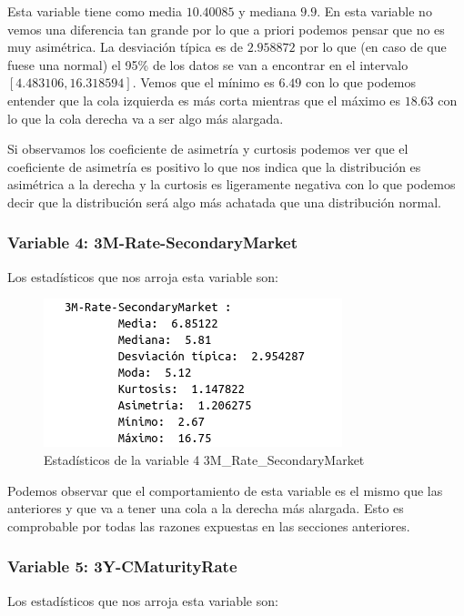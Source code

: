 \documentclass[12pt,a4paper]{article}
\begin{document}
Esta variable tiene como media $10.40085$ y mediana $9.9$. En esta variable no vemos una diferencia tan grande por lo que a priori podemos pensar que no es muy asimétrica. La desviación típica es de $2.958872$ por lo que (en caso de que fuese una normal) el 95\% de los datos se van a encontrar en el intervalo $[4.483106, 16.318594]$. Vemos que el mínimo es $6.49$ con lo que podemos entender que la cola izquierda es más corta mientras que el máximo es $18.63$ con lo que la cola derecha va a ser algo más alargada.

Si observamos los coeficiente de asimetría y curtosis podemos ver que el coeficiente de asimetría es positivo lo que nos indica que la distribución es asimétrica a la derecha y la curtosis es ligeramente negativa con lo que podemos decir que la distribución será algo más achatada que una distribución normal.

\subsubsection*{Variable 4: 3M-Rate-SecondaryMarket}

Los estadísticos que nos arroja esta variable son:

\begin{figure}[H]
	\centering
	\includegraphics[scale=0.7]{./Imagenes/estadisticos_3M_Rate_SecondaryMarket.png}
	\caption{Estadísticos de la variable 4 3M\_Rate\_SecondaryMarket}
\end{figure}

Podemos observar que el comportamiento de esta variable es el mismo que las anteriores y que va a tener una cola a la derecha más alargada. Esto es comprobable por todas las razones expuestas en las secciones anteriores.

\subsubsection*{Variable 5: 3Y-CMaturityRate}

Los estadísticos que nos arroja esta variable son:
\end{document}
